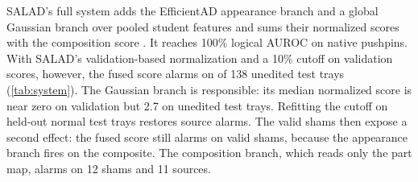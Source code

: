 SALAD's full system adds the EfficientAD appearance branch and a global Gaussian branch over pooled student features \cite{rippel2021} and sums their normalized scores with the composition score \cite{fucka2025}. It reaches 100\% logical AUROC on native pushpins. With SALAD's validation-based normalization and a 10\% cutoff on validation scores, however, the fused score alarms on \fullSrcVal{} of 138 unedited test trays (\cref{tab:system}). The Gaussian branch is responsible: its median normalized score is near zero on validation but 2.7 on unedited test trays. Refitting the cutoff on held-out normal test trays restores \fullSrcX{} source alarms. The valid shams then expose a second effect: the fused score still alarms on \fullShamX{} valid shams, because the appearance branch fires on the composite. The composition branch, which reads only the part map, alarms on 12 shams and 11 sources.
